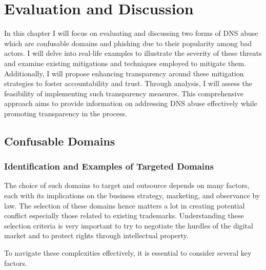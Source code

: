 \chapter{Evaluation and Discussion}

In this chapter I will focus on evaluating and discussing two forms of DNS abuse which are confusable domains and phishing due to their popularity among bad actors. I will delve into real-life examples to illustrate the severity of these threats and examine existing mitigations and techniques employed to mitigate them. Additionally, I will propose enhancing transparency around these mitigation strategies to foster accountability and trust. Through analysis, I will assess the feasibility of implementing such transparency measures. This comprehensive approach aims to provide information on addressing DNS abuse effectively while promoting transparency in the process.


\section{Confusable Domains}
\subsection{Identification and Examples of Targeted Domains}

The choice of such domains to target and outsource depends on many factors, each with its implications on the business strategy, marketing, and observance by law. The selection of these domains hence matters a lot in creating potential conflict especially those related to existing trademarks. Understanding these selection criteria is very important to try to negotiate the hurdles of the digital market and to protect rights through intellectual property. 

To navigate these complexities effectively, it is essential to consider several key factors. 

